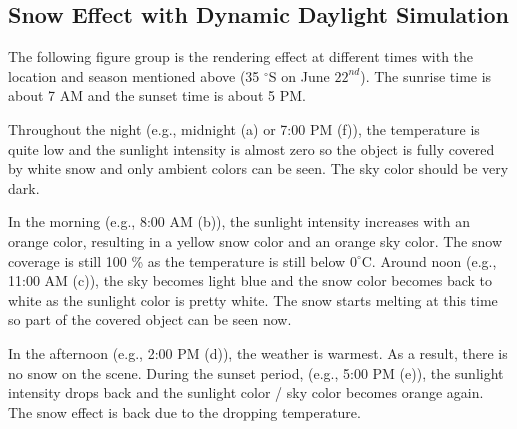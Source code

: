 \documentclass{article}
\begin{document}
\begin{itemize}
\subsection {Snow Effect with Dynamic Daylight Simulation}
\label{headings}
The following figure group is the rendering effect at different times with the location and season mentioned 
above (35 $^{\circ}$S on June \(22^{nd}\)). The sunrise time is about 7 AM and the sunset time is about 5 PM.

Throughout the night (e.g., midnight (a) or 7:00 PM (f)), the temperature is quite low and the sunlight 
intensity is almost zero so the object is fully covered by white snow and only ambient colors can be seen. The
sky color should be very dark.

In the morning (e.g., 8:00 AM (b)), the sunlight intensity increases with an orange color, resulting in a yellow
snow color and an orange sky color. The snow coverage is still 100 \% as the temperature is still below 
\(0^\circ\mathrm{C}\). Around noon (e.g., 11:00 AM (c)), the sky becomes light blue and the snow color becomes 
back to white as the sunlight color is pretty white. The snow starts melting at this time so part of the covered 
object can be seen now. 

In the afternoon (e.g., 2:00 PM (d)), the weather is warmest. As a result, there is no snow on the scene. During 
the sunset period, (e.g., 5:00 PM (e)), the sunlight intensity drops back and the sunlight color / sky color becomes
orange again. The snow effect is back due to the dropping temperature.


\end{itemize}
\end{document}

